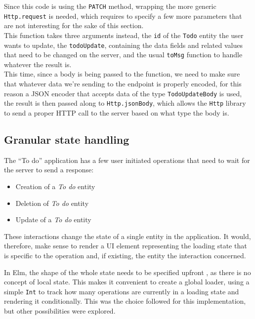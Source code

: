 \begin{sloppypar}
Since this code is using the \texttt{PATCH} method, wrapping the more generic \texttt{Http.request} is needed, which requires to specify a few more parameters that are not interesting for the sake of this section.\\
This function takes three arguments instead, the \texttt{id} of the \texttt{Todo} entity the user wants to update, the \texttt{todoUpdate}, containing the data fields and related values that need to be changed on the server, and the usual \texttt{toMsg} function to handle whatever the result is.\\
This time, since a body is being passed to the function, we need to make sure that whatever data we're sending to the endpoint is properly encoded, for this reason a JSON encoder that accepts data of the type \texttt{TodoUpdateBody} is used, the result is then passed along to \texttt{Http.jsonBody}, which allows the \texttt{Http} library to send a proper HTTP call to the server based on what type the body is.
\end{sloppypar}

\subsection{Granular state handling}
The ``To do'' application has a few user initiated operations that need to wait for the server to send a response:
\begin{itemize}
    \item Creation of a \textit{To do} entity
    \item Deletion of \textit{To do} entity
    \item Update of a \textit{To do} entity
\end{itemize}
These interactions change the state of a single entity in the application. It would, therefore, make sense to render a UI element representing the loading state that is specific to the operation and, if existing, the entity the interaction concerned.

In Elm, the shape of the whole state needs to be specified upfront \cite{noauthor_elm_nodate}, as there is no concept of local state. This makes it convenient to create a global loader, using a simple \texttt{Int} to track how many operations are currently in a loading state and rendering it conditionally. This was the choice followed for this implementation, but other possibilities were explored.\\

